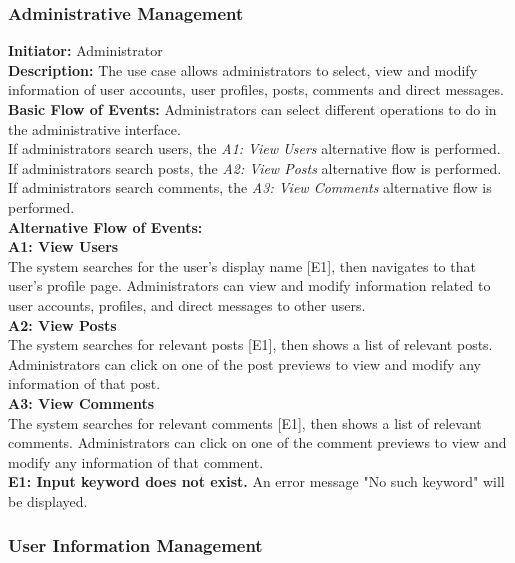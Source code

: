 \documentclass[11pt, a4paper]{article}
\begin{document}
\subsubsection{Administrative Management}

\begin{figure}[H]
    \centering
    
\end{figure}

\textbf{Initiator: }Administrator\\
\textbf{Description: }The use case allows administrators to select, view and modify information of user accounts, user profiles, posts, comments and direct messages.\\
\textbf{Basic Flow of Events: }Administrators can select different operations to do in the administrative interface.\\
If administrators search users, the \textit{A1: View Users} alternative flow is performed.\\
If administrators search posts, the \textit{A2: View Posts} alternative flow is performed.\\
If administrators search comments, the \textit{A3: View Comments} alternative flow is performed.\\
\textbf{ Alternative Flow of Events: }\\
\textbf{A1: View Users}\\
The system searches for the user's display name [E1], then navigates to that user's profile page. Administrators can view and modify information related to user accounts, profiles, and direct messages to other users.\\
\textbf{A2: View Posts}\\
The system searches for relevant posts [E1], then shows a list of relevant posts. Administrators can click on one of the post previews to view and modify any information of that post.\\
\textbf{A3: View Comments}\\
The system searches for relevant comments [E1], then shows a list of relevant comments. Administrators can click on one of the comment previews to view and modify any information of that comment.\\
\textbf{E1: Input keyword does not exist.} An error message "No such keyword" will be displayed.\\


\subsubsection{User Information Management}
\end{document}
